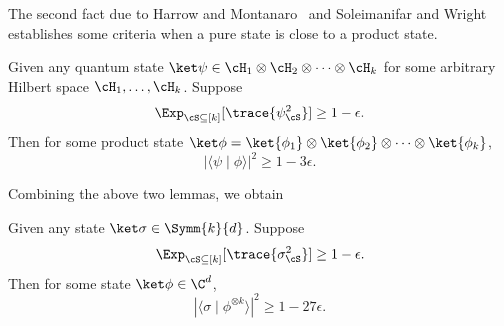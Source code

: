 The second fact  due to  Harrow and Montanaro~\cite[Appendix~B~Lemma~2]{HM13} and Soleimanifar and Wright~\cite{SW22matrix-product} establishes some criteria when a pure state is close to a product state.
\begin{lemma}
Given any quantum state $\ket\psi\in \cH_1 \otimes \cH_2 \otimes \cdots \otimes \cH_k$ for some arbitrary Hilbert space $\cH_1, \ldots, \cH_k$. Suppose 
\[
    \Exp_{\cS\subseteq [k]} [\trace{\psi_\cS^2}] \ge 1-\epsilon.
\]
Then for some product state $\ket\phi=\ket{\phi_1}\otimes\ket{\phi_2}\otimes\cdots\otimes\ket{\phi_k}$,
\[
    |\langle\psi \mid \phi\rangle|^2 \ge 1-3\epsilon.
\]
\end{lemma}

Combining the above two lemmas, we obtain
\begin{corollary}\label{cor:sym-prod}
Given any  state $\ket\sigma \in \Symm{k}{d}$. Suppose 
\[
    \Exp_{\cS\subseteq [k]} [\trace{\sigma_\cS^2}] \ge 1-\epsilon.
\]
Then for some  state $\ket\phi \in \C^d$,
\[
    |\langle\sigma \mid \phi^{\otimes k}\rangle|^2 \ge 1-27\epsilon.
\]
\end{corollary}

